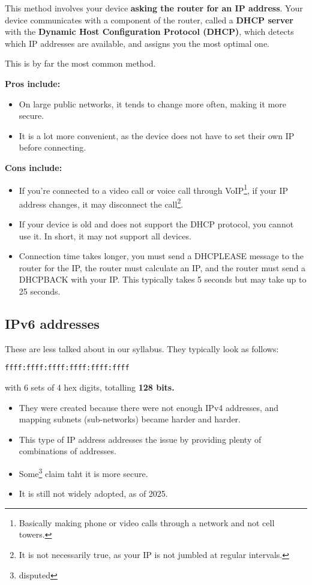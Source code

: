 \documentclass[../main.tex]{subfiles}
\begin{document}

This method involves your device \textbf{asking the router for an IP address}. Your device communicates with a component of the router, called a \textbf{DHCP server} with the \textbf{Dynamic Host Configuration Protocol (DHCP)}, which detects which IP addresses are available, and assigns you the most optimal one.

This is by far the most common method.

\textbf{Pros include:}
\begin{itemize}
    \item On large public networks, it tends to change more often, making it more secure.
    \item It is a lot more convenient, as the device does not have to set their own IP before connecting.
\end{itemize}

\textbf{Cons include:}
\begin{itemize}
    \item If you're connected to a video call or voice call through VoIP\footnote{Basically making phone or video calls through a network and not cell towers.}, if your IP address changes, it may disconnect the call\footnote{It is not necessarily true, as your IP is not jumbled at regular intervals.}.
    \item If your device is old and does not support the DHCP protocol, you cannot use it. In short, it may not support all devices.
    \item Connection time takes longer, you must send a {\ccmono DHCPLEASE} message to the router for the IP, the router must calculate an IP, and the router must send a {\ccmono DHCPBACK} with your IP. This typically takes 5 seconds but may take up to 25 seconds.
\end{itemize}

\subsection{IPv6 addresses}
\label{2:sec:ipv6}

These are less talked about in our syllabus. They typically look as follows:

\begin{verbatim}
ffff:ffff:ffff:ffff:ffff:ffff
\end{verbatim}

with 6 sets of 4 hex digits, totalling \textbf{128 bits.}

\begin{itemize}
    \item They were created because there were not enough IPv4 addresses, and mapping subnets (sub-networks) became harder and harder.
    \item This type of IP address addresses the issue by providing plenty of combinations of addresses.
    \item Some\footnote{disputed} claim taht it is more secure.
    \item It is still not widely adopted, as of 2025.
\end{itemize}
\end{document}
